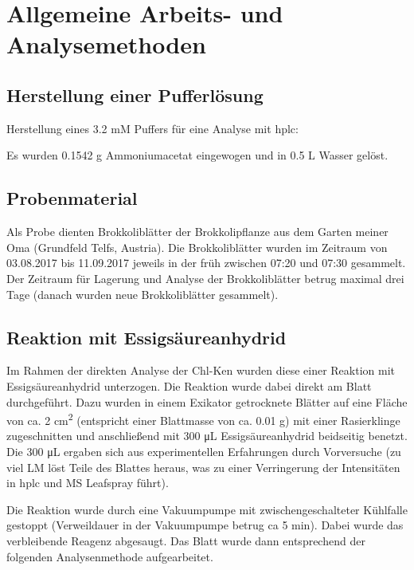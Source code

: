 \chapter{Allgemeine Arbeits- und Analysemethoden}

\section{Herstellung einer Pufferlösung}

Herstellung eines 3.2 mM  Puffers für eine Analyse mit \gls{hplc}:

Es wurden 0.1542 g Ammoniumacetat eingewogen und in 0.5 L Wasser gelöst.

\section{Probenmaterial}

Als Probe dienten Brokkoliblätter der Brokkolipflanze aus dem Garten meiner Oma (Grundfeld Telfs, Austria). Die Brokkoliblätter wurden im Zeitraum von 03.08.2017 bis 11.09.2017 jeweils in der früh zwischen 07:20 und 07:30 gesammelt. Der Zeitraum für Lagerung und Analyse der Brokkoliblätter betrug maximal drei Tage (danach wurden neue Brokkoliblätter gesammelt). \\

\section{Reaktion mit Essigsäureanhydrid} \label{sec:ReaktionEssig}

Im Rahmen der direkten Analyse der \gls{Chl-K}en wurden diese einer Reaktion mit Essigsäureanhydrid unterzogen. Die Reaktion wurde dabei direkt am Blatt durchgeführt. Dazu wurden in einem Exikator getrocknete Blätter auf eine Fläche von ca. 2 cm\textsuperscript{2} (entspricht einer Blattmasse von ca. 0.01 g) mit einer Rasierklinge zugeschnitten und anschließend mit 300 \si{\uL} Essigsäureanhydrid beidseitig benetzt. Die 300 \si{\uL} ergaben sich aus experimentellen Erfahrungen durch Vorversuche (zu viel LM löst Teile des Blattes heraus, was zu einer Verringerung der Intensitäten in \gls{hplc} und MS Leafspray führt). 

Die Reaktion wurde durch eine Vakuumpumpe mit zwischengeschalteter Kühlfalle gestoppt (Verweildauer in der Vakuumpumpe betrug \gls{ca} 5 min). Dabei wurde das verbleibende Reagenz abgesaugt. Das Blatt wurde dann entsprechend der folgenden Analysenmethode aufgearbeitet.

